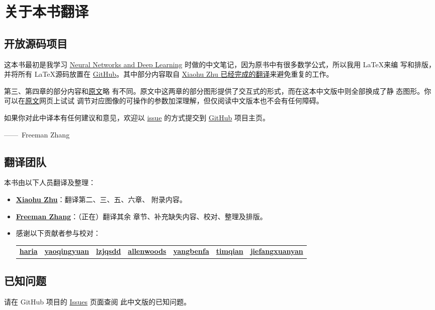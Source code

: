 
\chapter{关于本书翻译}
\label{ch:TranslationTeam}

\section*{开放源码项目}

这本书最初是我学习
\href{http://neuralnetworksanddeeplearning.com/index.html}{Neural Networks and
  Deep Learning} 时做的中文笔记，因为原书中有很多数学公式，所以我用 \LaTeX 来编
写和排版，并将所有 \LaTeX 源码放置在
\href{https://github.com/zhanggyb/nndl}{GitHub}。其中部分内容取自
\href{https://github.com/tigerneil/neural-networks-and-deep-learning-zh-cn}{Xiaohu
  Zhu 已经完成的翻译}来避免重复的工作。

第三、第四章的部分内容和\href{http://neuralnetworksanddeeplearning.com}{原文}略
有不同。原文中这两章的部分图形提供了交互式的形式，而在这本中文版中则全部换成了静
态图形。你可以在\href{http://neuralnetworksanddeeplearning.com}{原文}网页上试试
调节对应图像的可操作的参数加深理解，但仅阅读中文版本也不会有任何障碍。

如果你对此中译本有任何建议和意见，欢迎以
\href{https://github.com/zhanggyb/nndl/issues}{issue} 的方式提交到
\href{https://github.com/zhanggyb/nndl}{GitHub} 项目主页。

\begin{flushright}
  ——~Freeman Zhang
\end{flushright}

\section*{翻译团队}
\label{sec:TranslationTeam}

本书由以下人员翻译及整理：

\begin{itemize}
\item \textbf{\href{mailto:xhzhu.nju@gmail}{Xiaohu Zhu}}：翻译第二、三、五、六章、
  附录内容。
\item \textbf{\href{mailto:zhanggyb@gmail.com}{Freeman Zhang}}：（正在）翻译其余
  章节、补充缺失内容、校对、整理及排版。
\item 感谢以下贡献者参与校对：\\
    \begin{tabular}{l l l l l l l}
      \bfseries\href{https://github.com/haria}{haria} 
      & \bfseries\href{https://github.com/yaoqingyuan}{yaoqingyuan}
      & \bfseries\href{https://github.com/lzjqsdd}{lzjqsdd}
      & \bfseries\href{https://github.com/allenwoods}{allenwoods}
      & \bfseries\href{https://github.com/yangbenfa}{yangbenfa}
      & \bfseries\href{https://github.com/timqian}{timqian}
      & \bfseries\href{https://github.com/jiefangxuanyan}{jiefangxuanyan} \\
    \end{tabular}
\end{itemize}

\section*{已知问题}
\label{sec:KnownIssues}

请在 GitHub 项目的 \href{https://github.com/zhanggyb/nndl/issues}{Issues} 页面查阅
此中文版的已知问题。